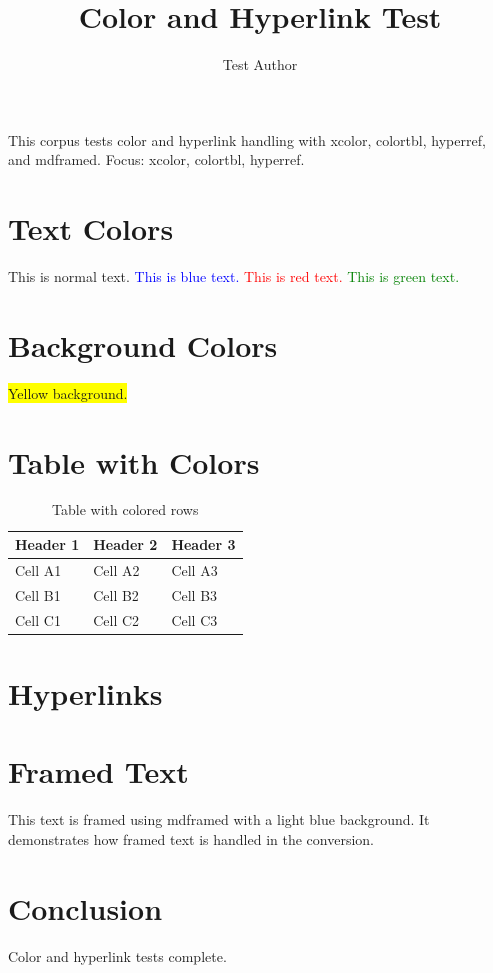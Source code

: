 \documentclass{article}
\title{Color and Hyperlink Test}
\author{Test Author}
\begin{document}
\maketitle

\begin{abstrct}
This corpus tests color and hyperlink handling with xcolor, colortbl,
hyperref, and mdframed.
Focus: xcolor, colortbl, hyperref.
\end{abstrct}

\section{Text Colors}

This is normal text. \textcolor{blue}{This is blue text.}
\textcolor{red}{This is red text.}
\textcolor{green}{This is green text.}

\section{Background Colors}

\colorbox{yellow}{Yellow background.}

\section{Table with Colors}

\begin{table}[ht]
\centering
\caption{Table with colored rows}
\label{tab:colors}
\begin{tabular}{lll}
  \toprule
  \rowcolor{lightblue}
  Header 1 & Header 2 & Header 3 \\
  \midrule
  \rowcolor{lightgreen}
  Cell A1 & Cell A2 & Cell A3 \\
  Cell B1 & Cell B2 & Cell B3 \\
  \rowcolor{lightyellow}
  Cell C1 & Cell C2 & Cell C3 \\
  \bottomrule
\end{tabular}
\end{table}

\section{Hyperlinks}

\begin{itemize}
  \item URL: \url{https://www.example.org}
  \item Link: \href{https://www.example.org}{Example Website}
  \item Email: \hrefmailto:author@example.org}{author@example.org}
\end{itemize}

\section{Framed Text}

\begin{mdframed}[backgroundcolor=lightblue]
This text is framed using mdframed with a light blue background.
It demonstrates how framed text is handled in the conversion.
\end{mdframed}

\section{Conclusion}

Color and hyperlink tests complete.
\end{document}
